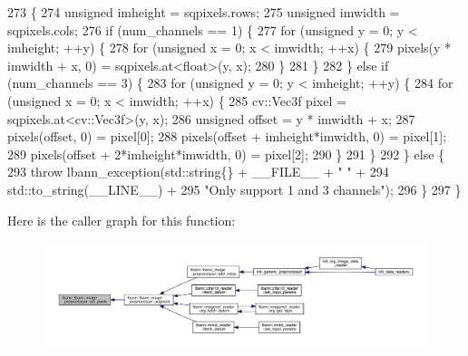 \begin{DoxyCode}
273                            \{
274   \textcolor{keywordtype}{unsigned} imheight = sqpixels.rows;
275   \textcolor{keywordtype}{unsigned} imwidth = sqpixels.cols;
276   \textcolor{keywordflow}{if} (num\_channels == 1) \{
277     \textcolor{keywordflow}{for} (\textcolor{keywordtype}{unsigned} y = 0; y < imheight; ++y) \{
278       \textcolor{keywordflow}{for} (\textcolor{keywordtype}{unsigned} x = 0; x < imwidth; ++x) \{
279         pixels(y * imwidth + x, 0) = sqpixels.at<\textcolor{keywordtype}{float}>(y, x);
280       \}
281     \}
282   \} \textcolor{keywordflow}{else} \textcolor{keywordflow}{if} (num\_channels == 3) \{
283     \textcolor{keywordflow}{for} (\textcolor{keywordtype}{unsigned} y = 0; y < imheight; ++y) \{
284       \textcolor{keywordflow}{for} (\textcolor{keywordtype}{unsigned} x = 0; x < imwidth; ++x) \{
285         cv::Vec3f pixel = sqpixels.at<cv::Vec3f>(y, x);
286         \textcolor{keywordtype}{unsigned} offset = y * imwidth + x;
287         pixels(offset, 0) = pixel[0];
288         pixels(offset + imheight*imwidth, 0) = pixel[1];
289         pixels(offset + 2*imheight*imwidth, 0) = pixel[2];
290       \}
291     \}
292   \} \textcolor{keywordflow}{else} \{
293     \textcolor{keywordflow}{throw} lbann\_exception(std::string\{\} + \_\_FILE\_\_ + \textcolor{stringliteral}{" "} +
294                           std::to\_string(\_\_LINE\_\_) +
295                           \textcolor{stringliteral}{"Only support 1 and 3 channels"});
296   \}
297 \}
\end{DoxyCode}
Here is the caller graph for this function\+:\nopagebreak
\begin{figure}[H]
\begin{center}
\leavevmode
\includegraphics[width=350pt]{classlbann_1_1lbann__image__preprocessor_a3e99be32b95a415fd8d616cb85075df1_icgraph}
\end{center}
\end{figure}
\mbox{\label{classlbann_1_1lbann__image__preprocessor_a7dc609e33febdc7fc29bdc9270594bea}} 
